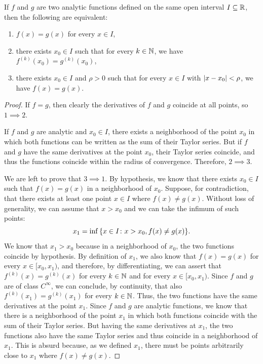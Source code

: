 \begin{theorem}
    If $f$ and $g$ are two analytic functions defined on the same open interval
  $I\subseteq {\mathbb R}$, then the following are equivalent:
  \begin{enumerate}
   \item $f(x)=g(x)$ for every $x\in I$,
   \item there exists $x_0\in I$ such that for every $k\in {\mathbb N}$, we have $f^{(k)}(x_0) = g^{(k)}(x_0)$,
   \item there exists $x_0\in I$ and $\rho>0$ such that for every $x\in I$ with ${\left|x-x_0\right|}<\rho$, we have $f(x)=g(x)$.
  \end{enumerate}
  \end{theorem}
  \begin{proof}
    If $f=g$, then clearly the derivatives of $f$ and $g$ coincide at all
  points, so $1\implies 2$.
  
    If $f$ and $g$ are analytic and $x_0\in I$, there exists a neighborhood of
  the point $x_0$ in which both functions can be written as the sum of their
  Taylor series. But if $f$ and $g$ have the same derivatives at the point
  $x_0$, their Taylor series coincide, and thus the functions coincide within
  the radius of convergence. Therefore, $2\implies 3$.
  
    We are left to prove that $3 \implies 1$. By hypothesis, we know that there
  exists $x_0\in I$ such that $f(x) = g(x)$ in a neighborhood of $x_0$. Suppose,
  for contradiction, that there exists at least one point $x\in I$ where $f(x)
  \neq g(x)$. Without loss of generality, we can assume that $x>x_0$ and we can
  take the infimum of such points:
  \[
    x_1 = \inf{\left\{ x\in I\colon x>x_0, f(x)\neq g(x) \right\}}.
  \]
    We know that $x_1>x_0$ because in a neighborhood of $x_0$, the two functions
  coincide by hypothesis. By definition of $x_1$, we also know that $f(x)=g(x)$
  for every $x\in [x_0,x_1)$, and therefore, by differentiating, we can assert
  that $f^{(k)}(x) = g^{(k)}(x)$ for every $k\in {\mathbb N}$ and for every $x\in
  [x_0,x_1)$. Since $f$ and $g$ are of class $C^\infty$, we can conclude, by
  continuity, that also $f^{(k)}(x_1)=g^{(k)}(x_1)$ for every $k\in {\mathbb N}$. Thus,
  the two functions have the same derivatives at the point $x_1$. Since $f$ and
  $g$ are analytic functions, we know that there is a neighborhood of the point
  $x_1$ in which both functions coincide with the sum of their Taylor series.
  But having the same derivatives at $x_1$, the two functions also have the same
  Taylor series and thus coincide in a neighborhood of $x_1$. This is absurd
  because, as we defined $x_1$, there must be points arbitrarily close to $x_1$
  where $f(x)\neq g(x)$.
  \end{proof}